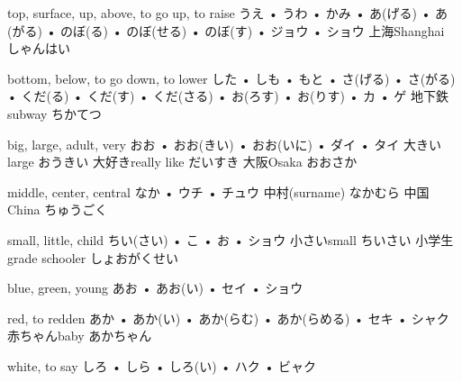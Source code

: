 



\setcounter{cardnum}{57}

		{top, surface, up, above, to go up, to raise}
		{うえ • うわ • かみ • あ(げる) • あ(がる) • のぼ(る) • のぼ(せる) • のぼ(す) • ジョウ • ショウ}
		{上海}{Shanghai しゃんはい}
		{}{}
		{}{}
		{}{}
		{}{}

		{bottom, below, to go down, to lower}
		{した • しも • もと • さ(げる) • さ(がる) • くだ(る) • くだ(す) • くだ(さる) • お(ろす) • お(りす) • カ • ゲ}
		{地下鉄}{subway ちかてつ}
		{}{}
		{}{}
		{}{}
		{}{}

		{big, large, adult, very}
		{おお • おお(きい) • おお(いに) • ダイ • タイ}
		{大きい}{large おうきい}
		{大好き}{really like だいすき}
		{大阪}{Osaka おおさか}
		{}{}
		{}{}

		{middle, center, central}
		{なか • ウチ • チュウ}
		{中村}{(surname) なかむら}
		{中国}{China ちゅうごく}
		{}{}
		{}{}
		{}{}

		{small, little, child}
		{ちい(さい) • こ • お • ショウ}
		{小さい}{small ちいさい}
		{小学生}{grade schooler しょおがくせい}
		{}{}
		{}{}
		{}{}

		{blue, green, young}
		{あお • あお(い) • セイ • ショウ}
		{}{}
		{}{}
		{}{}
		{}{}
		{}{}

		{red, to redden}
		{あか • あか(い) • あか(らむ) • あか(らめる) • セキ • シャク}
		{赤ちゃん}{baby あかちゃん}
		{}{}
		{}{}
		{}{}
		{}{}

		{white, to say}
		{しろ • しら • しろ(い) • ハク • ビャク}
		{}{}
		{}{}
		{}{}
		{}{}
		{}{}

